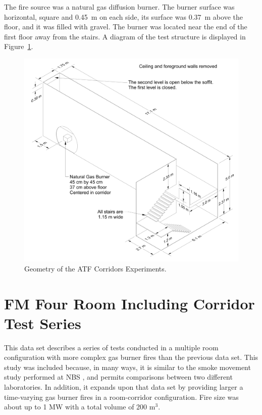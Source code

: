 The fire source was a natural gas diffusion burner.  The burner surface was horizontal, square and 0.45~m on each side, its surface was 0.37~m above the floor, and it was filled with gravel.
The burner was located near the end of the first floor away from the stairs. A diagram of the test structure is displayed in Figure~\ref{ATF Drawing}.


\begin{figure}[h]
\begin{center}
\includegraphics[width=6.5in]{FIGURES/ATF_Corridors/ATF_Corridors_Drawing}
\end{center}
\caption{Geometry of the ATF Corridors Experiments.}
\label{ATF Drawing}
\end{figure}

\clearpage

\section{FM Four Room Including Corridor Test Series}

This data set describes a series of tests conducted in a multiple room configuration with more complex gas burner fires than the previous data set.  This study \cite{Heskestad:1986} was included because, in many ways, it is similar to the smoke movement study performed at NBS \cite{Peacock:1988}, and permits comparisons between two different laboratories. In addition, it expands upon that data set by providing larger a time-varying gas burner fires in a room-corridor configuration. Fire size was about up to 1 MW with a total volume of 200 m$^3$.

